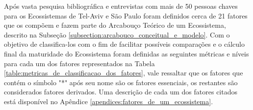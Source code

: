Após vasta pesquisa bibliográfica e entrevistas com mais de 50 pessoas chaves para os Ecossistemas de Tel-Aviv e São Paulo foram definidos cerca de 21 fatores que os compõem e fazem parte do Arcabouço Teórico de um Ecossistema, descrito na Subseção \ref{subsection:arcabouco_conceitual_e_modelo}. Com o objetivo de classifica-los com o fim de facilitar possíveis comparações e o cálculo final da maturidade do Ecossistema foram definidas as seguintes métricas e níveis para cada um dos fatores representados na Tabela \ref{table:metricas_de_classificacao_dos_fatores}, vale ressaltar que os fatores que contém o símbolo "*"  após seu nome são os fatores essenciais, os restantes são considerados fatores derivados. Uma descrição de cada um dos fatores citados está disponível no Apêndice \ref{apendices:fatores_de_um_ecossistema}.

